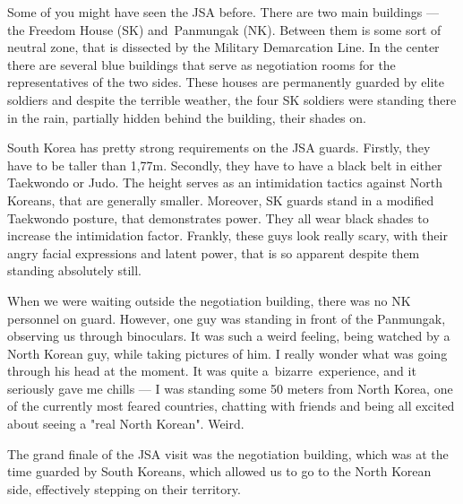 \begin{post}
\begin{content}
Some of you might have seen the JSA before. There are two main buildings — the Freedom House (SK) and Pan\-mun\-gak (NK). Between them is some sort of neutral zone, that is dissected by the Military Demarcation Line. In the center there are several blue buildings that serve as negotiation rooms for the representatives of the two sides. These houses are permanently guarded by elite soldiers and despite the terrible weather, the four SK soldiers were standing there in the rain, partially hidden behind the building, their shades on.

South Korea has pretty strong requirements on the JSA guards. Firstly, they have to be taller than 1,77m. Secondly, they have to have a black belt in either Taekwondo or Judo. The height serves as an intimidation tactics against North Koreans, that are generally smaller. Moreover, SK guards stand in a modified Taekwondo posture, that demonstrates power. They all wear black shades to increase the intimidation factor. Frankly, these guys look really scary, with their angry facial expressions and latent power, that is so apparent despite them standing absolutely still.

When we were waiting outside the negotiation building, there was no NK personnel on guard. However, one guy was standing in front of the Panmungak, observing us through binoculars. It was such a weird feeling, being watched by a North Korean guy, while taking pictures of him. I really wonder what was going through his head at the moment. It was quite a bizarre experience, and it seriously gave me chills — I was standing some 50 meters from North Korea, one of the currently most feared countries, chatting with friends and being all excited about seeing a "real North Korean". Weird.


The grand finale of the JSA visit was the negotiation building, which was at the time guarded by South Koreans, which allowed us to go to the North Korean side, effectively stepping on their territory.



\end{content}
\end{post}
